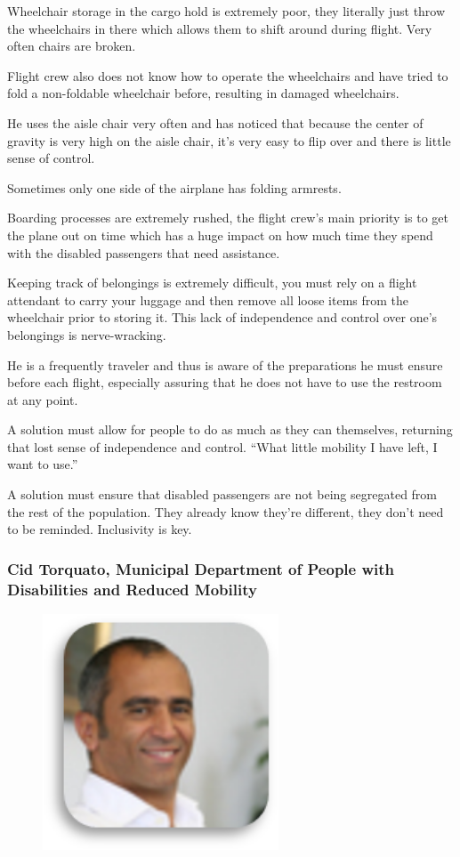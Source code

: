 \begin{list}{-}{}
  \item Wheelchair storage in the cargo hold is extremely poor, they literally just throw the wheelchairs in there which allows them to shift around during flight. Very often chairs are broken. 
  \item Flight crew also does not know how to operate the wheelchairs and have tried to fold a non-foldable wheelchair before, resulting in damaged wheelchairs.
  \item He uses the aisle chair very often and has noticed that because the center of gravity is very high on the aisle chair, it’s very easy to flip over and there is little sense of control.
  \item Sometimes only one side of the airplane has folding armrests. 
  \item Boarding processes are extremely rushed, the flight crew’s main priority is to get the plane out on time which has a huge impact on how much time they spend with the disabled passengers that need assistance. 
  \item Keeping track of belongings is extremely difficult, you must rely on a flight attendant to carry your luggage and then remove all loose items from the wheelchair prior to storing it. This lack of independence and control over one’s belongings is nerve-wracking.
  \item He is a frequently traveler and thus is aware of the preparations he must ensure before each flight, especially assuring that he does not have to use the restroom at any point. 
  \item A solution must allow for people to do as much as they can themselves, returning that lost sense of independence and control. “What little mobility I have left, I want to use.”
  \item A solution must ensure that disabled passengers are not being segregated from the rest of the population. They already know they’re different, they don’t need to be reminded. Inclusivity is key. 
\end{list}

\subsubsection{Cid Torquato, Municipal Department of People with Disabilities and Reduced Mobility}
\begin{figure}[h]
  \centering
     \includegraphics[width=7cm]{images/image026}
  \label{fig:26}
\end{figure}

